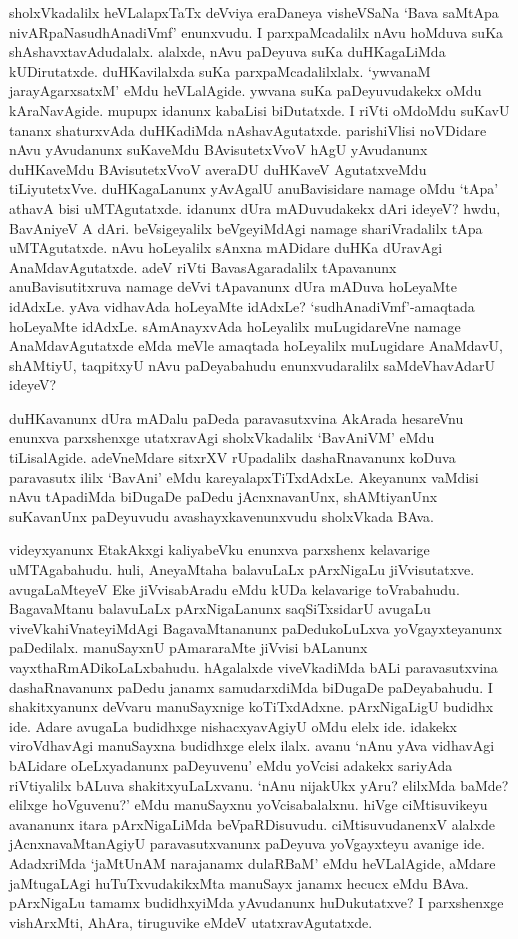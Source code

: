 sholxVkadalilx heVLalapxTaTx deVviya eraDaneya visheVSaNa `Bava saMtApa nivARpaNasudhAnadiVmf' enunxvudu. I parxpaMcadalilx 
nAvu hoMduva suKa shAshavxtavAdudalalx. alalxde, nAvu paDeyuva suKa duHKagaLiMda kUDirutatxde. duHKavilalxda 
suKa parxpaMcadalilxlalx. `ywvanaM jarayAgarxsatxM' eMdu heVLalAgide. ywvana suKa paDeyuvudakekx oMdu 
kAraNavAgide. mupupx idanunx kabaLisi biDutatxde. I riVti oMdoMdu suKavU tananx shaturxvAda duHKadiMda 
nAshavAgutatxde. parishiVlisi noVDidare nAvu yAvudanunx suKaveMdu BAvisutetxVvoV 
hAgU yAvudanunx duHKaveMdu BAvisutetxVvoV averaDU duHKaveV AgutatxveMdu tiLiyutetxVve. duHKagaLanunx 
yAvAgalU anuBavisidare namage oMdu `tApa' athavA bisi uMTAgutatxde. idanunx dUra 
mADuvudakekx dAri ideyeV? hwdu, BavAniyeV A dAri. beVsigeyalilx beVgeyiMdAgi 
namage shariVradalilx tApa uMTAgutatxde. nAvu hoLeyalilx sAnxna mADidare duHKa dUravAgi 
AnaMdavAgutatxde. adeV riVti BavasAgaradalilx tApavanunx anuBavisutitxruva namage deVvi 
tApavanunx dUra mADuva hoLeyaMte idAdxLe. yAva vidhavAda hoLeyaMte idAdxLe? 
`sudhAnadiVmf'-amaqtada hoLeyaMte idAdxLe. sAmAnayxvAda hoLeyalilx muLugidareVne 
namage AnaMdavAgutatxde eMda meVle amaqtada hoLeyalilx muLugidare AnaMdavU, shAMtiyU, 
taqpitxyU nAvu paDeyabahudu enunxvudaralilx saMdeVhavAdarU ideyeV?

duHKavanunx dUra mADalu paDeda paravasutxvina AkArada hesareVnu enunxva parxshenxge utatxravAgi sholxVkadalilx 
`BavAniVM' eMdu tiLisalAgide. adeVneMdare sitxrXV rUpadalilx dashaRnavanunx koDuva paravasutx ililx `BavAni' eMdu 
kareyalapxTiTxdAdxLe. 
Akeyanunx vaMdisi nAvu tApadiMda biDugaDe paDedu jAcnxnavanUnx, shAMtiyanUnx suKavanUnx paDeyuvudu avashayxkavenunxvudu sholxVkada BAva.

videyxyanunx EtakAkxgi kaliyabeVku enunxva parxshenx  kelavarige uMTAgabahudu. huli, AneyaMtaha balavuLaLx pArxNigaLu jiVvisutatxve. avugaLaMteyeV 
Eke jiVvisabAradu eMdu kUDa kelavarige toVrabahudu. BagavaMtanu balavuLaLx pArxNigaLanunx saqSiTxsidarU avugaLu viveVkahiVnateyiMdAgi 
BagavaMtananunx paDedukoLuLxva yoVgayxteyanunx paDedilalx. manuSayxnU pAmararaMte jiVvisi bALanunx vayxthaRmADikoLaLxbahudu. 
hAgalalxde viveVkadiMda bALi paravasutxvina dashaRnavanunx paDedu janamx samudarxdiMda biDugaDe paDeyabahudu. I shakitxyanunx deVvaru 
manuSayxnige koTiTxdAdxne. pArxNigaLigU budidhx ide. Adare avugaLa budidhxge nishacxyavAgiyU oMdu elelx ide. idakekx viroVdhavAgi 
manuSayxna budidhxge elelx ilalx. avanu `nAnu yAva vidhavAgi bALidare oLeLxyadanunx paDeyuvenu' eMdu yoVcisi adakekx sariyAda 
riVtiyalilx bALuva shakitxyuLaLxvanu. `nAnu nijakUkx yAru? elilxMda baMde? elilxge hoVguvenu?' eMdu manuSayxnu yoVcisabalalxnu. 
hiVge ciMtisuvikeyu avananunx itara pArxNigaLiMda beVpaRDisuvudu. ciMtisuvudanenxV alalxde jAcnxnavaMtanAgiyU paravasutxvanunx paDeyuva 
yoVgayxteyu avanige ide. AdadxriMda `jaMtUnAM narajanamx dulaRBaM' eMdu heVLalAgide, aMdare jaMtugaLAgi huTuTxvudakikxMta manuSayx 
janamx hecucx eMdu BAva. pArxNigaLu tamamx budidhxyiMda yAvudanunx huDukutatxve? I parxshenxge vishArxMti, AhAra, tiruguvike eMdeV utatxravAgutatxde.

